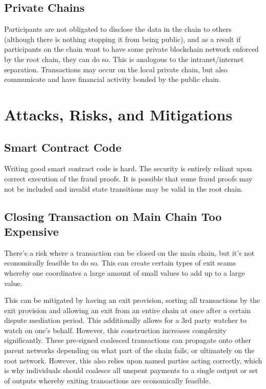 \documentclass[letterpaper, 11pt]{article}
\begin{document}
\subsection{Private Chains}

Participants are not obligated to disclose the data in the chain to others
(although there is nothing stopping it from being public), and as a result if
participants on the chain want to have some private blockchain network enforced
by the root chain, they can do so. This is analogous to the intranet/internet
separation. Transactions may occur on the local private chain, but also
communicate and have financial activity bonded by the public chain.

\section{Attacks, Risks, and Mitigations}

\subsection{Smart Contract Code}

Writing good smart contract code is hard. The security is entirely reliant upon
correct execution of the fraud proofs. It is possible that some fraud proofs
may not be included and invalid state transitions may be valid in the root
chain.

\subsection{Closing Transaction on Main Chain Too Expensive}

There's a risk where a transaction can be closed on the main chain, but it's not
economically feasible to do so. This can create certain types of exit scams
whereby one coordinates a large amount of small values to add up to a large
value.

This can be mitigated by having an exit provision, sorting all transactions by
the exit provision and allowing an exit from an entire chain at once after a
certain dispute mediation period. This additionally allows for a 3rd party
watcher to watch on one's behalf. However, this construction increases
complexity significantly. These pre-signed coalesced transactions can propagate
onto other parent networks depending on what part of the chain fails, or
ultimately on the root network. However, this also relies upon named parties
acting correctly, which is why individuals should coalesce all unspent payments
to a single output or set of outputs whereby exiting transactions are
economically feasible.
\end{document}
